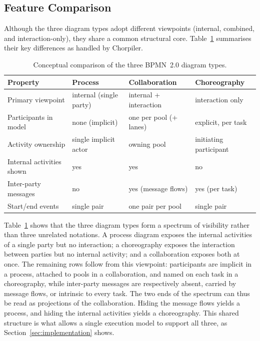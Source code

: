 \documentclass[runningheads]{llncs}
\begin{document}
\subsection{Feature Comparison}
Although the three diagram types adopt different viewpoints (internal, combined, and interaction-only), they share a common structural core. 
Table~\ref{tab:bpmn-comparison} summarises their key differences as handled by Chorpiler.
\begin{table}[t]
\centering
\caption{Conceptual comparison of the three BPMN~2.0 diagram types.}
\label{tab:bpmn-comparison}
\begin{tabular}{@{}llll@{}}
\toprule
\textbf{Property} & \textbf{Process} & \textbf{Collaboration} & \textbf{Choreography} \\
\midrule
Primary viewpoint        & internal (single party) & internal + interaction   & interaction only \\
Participants in model     & none (implicit)         & one per pool (+ lanes)   & explicit, per task \\
Activity ownership        & single implicit actor   & owning pool              & initiating participant \\
Internal activities shown & yes                     & yes                      & no \\
Inter-party messages      & no                      & yes (message flows)      & yes (per task) \\
Start/end events          & single pair             & one pair per pool        & single pair \\
\bottomrule
\end{tabular}
\end{table}

Table~\ref{tab:bpmn-comparison} shows that the three diagram types form a spectrum of visibility rather than three unrelated notations. A process diagram exposes the internal activities of a single party but no interaction; a choreography exposes the interaction between parties but no internal activity; and a collaboration exposes both at once. The remaining rows follow from this viewpoint: participants are implicit in a process, attached to pools in a collaboration, and named on each task in a choreography, while inter-party messages are respectively absent, carried by message flows, or intrinsic to every task. The two ends of the spectrum can thus be read as projections of the collaboration. Hiding the message flows yields a process, and hiding the internal activities yields a choreography. This shared structure is what allows a single execution model to support all three, as Section~\ref{sec:implementation} shows.
\end{document}
